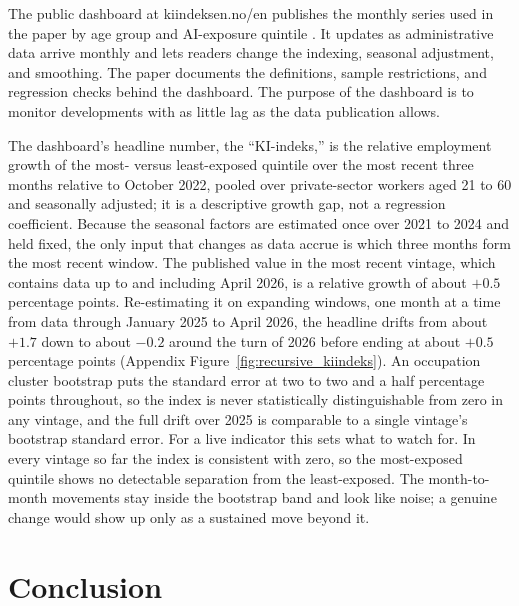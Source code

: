 \documentclass[12pt]{article}
\begin{document}
The public dashboard at kiindeksen.no/en publishes the monthly series used in the paper by age group and AI-exposure quintile \citep{kiindeksen2026}. It updates as administrative data arrive monthly and lets readers change the indexing, seasonal adjustment, and smoothing. The paper documents the definitions, sample restrictions, and regression checks behind the dashboard. The purpose of the dashboard is to monitor developments with as little lag as the data publication allows.

The dashboard's headline number, the ``KI-indeks,'' is the relative employment growth of the most- versus least-exposed quintile over the most recent three months relative to October 2022, pooled over private-sector workers aged 21 to 60 and seasonally adjusted; it is a descriptive growth gap, not a regression coefficient. Because the seasonal factors are estimated once over 2021 to 2024 and held fixed, the only input that changes as data accrue is which three months form the most recent window. The published value in the most recent vintage, which contains data up to and including April 2026, is a relative growth of about $+0.5$ percentage points. Re-estimating it on expanding windows, one month at a time from data through January 2025 to April 2026, the headline drifts from about $+1.7$ down to about $-0.2$ around the turn of 2026 before ending at about $+0.5$ percentage points (Appendix Figure~\ref{fig:recursive_kiindeks}). An occupation cluster bootstrap puts the standard error at two to two and a half percentage points throughout, so the index is never statistically distinguishable from zero in any vintage, and the full drift over 2025 is comparable to a single vintage's bootstrap standard error. For a live indicator this sets what to watch for. In every vintage so far the index is consistent with zero, so the most-exposed quintile shows no detectable separation from the least-exposed. The month-to-month movements stay inside the bootstrap band and look like noise; a genuine change would show up only as a sustained move beyond it.

\section{Conclusion}\label{sec:conclusion}
\end{document}
